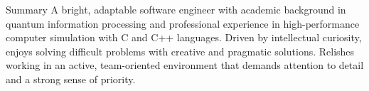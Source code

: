 \documentclass{resume} %
\begin{document}
%
\begin{rSection}{Summary}
A bright, adaptable software engineer with academic background in quantum information processing and professional experience in high-performance computer simulation with C and C++ languages. Driven by intellectual curiosity, enjoys solving difficult problems with creative and pragmatic solutions. Relishes working in an active, team-oriented environment that demands attention to detail and a strong sense of priority.
\end{rSection}

\end{document}
